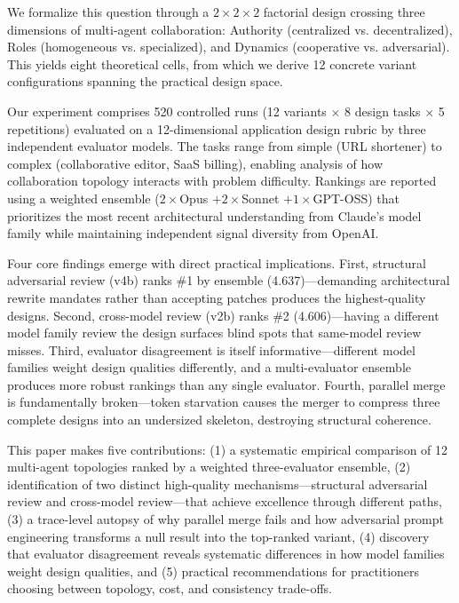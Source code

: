 \documentclass[conference]{IEEEtran}
\begin{document}
We formalize this question through a $2\times2\times2$ factorial design crossing three dimensions of multi-agent collaboration: Authority (centralized vs. decentralized), Roles (homogeneous vs. specialized), and Dynamics (cooperative vs. adversarial). This yields eight theoretical cells, from which we derive 12 concrete variant configurations spanning the practical design space.

Our experiment comprises 520 controlled runs (12 variants $\times$ 8 design tasks $\times$ 5 repetitions) evaluated on a 12-dimensional application design rubric by three independent evaluator models. The tasks range from simple (URL shortener) to complex (collaborative editor, SaaS billing), enabling analysis of how collaboration topology interacts with problem difficulty. Rankings are reported using a weighted ensemble ($2\times$Opus $+ 2\times$Sonnet $+ 1\times$GPT-OSS) that prioritizes the most recent architectural understanding from Claude's model family while maintaining independent signal diversity from OpenAI.

Four core findings emerge with direct practical implications. First, structural adversarial review (v4b) ranks \#1 by ensemble (4.637)---demanding architectural rewrite mandates rather than accepting patches produces the highest-quality designs. Second, cross-model review (v2b) ranks \#2 (4.606)---having a different model family review the design surfaces blind spots that same-model review misses. Third, evaluator disagreement is itself informative---different model families weight design qualities differently, and a multi-evaluator ensemble produces more robust rankings than any single evaluator. Fourth, parallel merge is fundamentally broken---token starvation causes the merger to compress three complete designs into an undersized skeleton, destroying structural coherence.

This paper makes five contributions: (1) a systematic empirical comparison of 12 multi-agent topologies ranked by a weighted three-evaluator ensemble, (2) identification of two distinct high-quality mechanisms---structural adversarial review and cross-model review---that achieve excellence through different paths, (3) a trace-level autopsy of why parallel merge fails and how adversarial prompt engineering transforms a null result into the top-ranked variant, (4) discovery that evaluator disagreement reveals systematic differences in how model families weight design qualities, and (5) practical recommendations for practitioners choosing between topology, cost, and consistency trade-offs.
\end{document}
